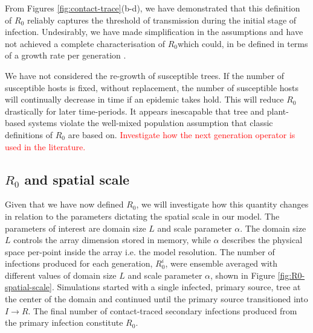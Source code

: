 From Figures \ref{fig:contact-trace}(b-d), we have demonstrated that this definition of $R_0$ %
reliably captures the threshold of transmission during the initial stage of infection. %
Undesirably, we have made simplification in the assumptions and have not achieved a complete %
characterisation of $R_0$\textemdash which could, in be defined in terms of a growth %
rate per generation \cite{R0-construct}. %

We have not considered the re-growth of susceptible trees. %
If the number of susceptible hosts is fixed, without replacement, the number of susceptible hosts %
will continually decrease in time if an epidemic takes hold. %
This will reduce $R_0$ drastically for later time-periods. %
It appears inescapable that tree and plant-based systems violate the well-mixed population %
assumption that classic definitions of $R_0$ are based on. %
\textcolor{red}{Investigate how the next generation operator is used in the literature.}\\


\subsection{$R_0$ and spatial scale}

Given that we have now defined $R_0$, we will investigate how this quantity changes in relation %
to the parameters dictating the spatial scale in our model. %
The parameters of interest are domain size $L$ and scale parameter $\alpha$. %
The domain size $L$ controls the array dimension stored in  memory, while $\alpha$ %
describes the physical space per-point inside the array i.e. the model resolution. %
The number of infections produced for each generation, $R_0^i$, were ensemble averaged with %
different values of domain size $L$ and scale parameter $\alpha$, %
shown in Figure \ref{fig:R0-spatial-scale}. Simulations started with a single infected, %
primary source, tree at the center of the domain and continued until the primary source %
transitioned into $I\rightarrow R$. %
The final number of contact-traced secondary infections produced from the primary infection %
constitute $R_0$.\\

